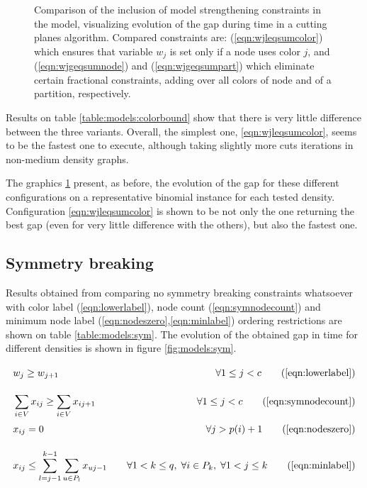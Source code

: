 \begin{figure}
\caption{Comparison of the inclusion of model strengthening constraints in the model, visualizing evolution of the gap during time in a cutting planes algorithm. Compared constraints are: (\ref{eqn:wjleqsumcolor}) which ensures that variable $w_j$ is set only if a node uses color $j$, and (\ref{eqn:wjgeqsumnode}) and (\ref{eqn:wjgeqsumpart}) which eliminate certain fractional constraints, adding over all colors of node and of a partition, respectively.}
\label{fig:models:colorbound}
\end{figure}

Results on table \ref{table:models:colorbound} show that there is very little difference between the three variants. Overall, the simplest one, \ref{eqn:wjleqsumcolor}, seems to be the fastest one to execute, although taking slightly more cuts iterations in non-medium density graphs. 

The graphics \ref{fig:models:colorbound} present, as before, the evolution of the gap for these different configurations on a representative binomial instance for each tested density. Configuration \ref{eqn:wjleqsumcolor} is shown to be not only the one returning the best gap (even for very little difference with the others), but also the fastest one.

\subsection{Symmetry breaking}

Results obtained from comparing no symmetry breaking constraints whatsoever with color label (\ref{eqn:lowerlabel}), node count (\ref{eqn:symnodecount}) and minimum node label (\ref{eqn:nodeszero},\ref{eqn:minlabel}) ordering restrictions are shown on table \ref{table:models:sym}. The evolution of the obtained gap in time for different densities is shown in figure \ref{fig:models:sym}.

\begin{align*}
& w_j \geq w_{j+1} \sumheight \quad &\forall 1 \leq j < c \tag{\ref{eqn:lowerlabel}} \\
& \sum_{i \in V} x_{ij} \geq \sum_{i \in V} x_{ij+1} \quad &\forall 1 \leq j < c \tag{\ref{eqn:symnodecount}} \\
& x_{ij} = 0 \sumheight \quad &\forall j > p(i) + 1 \tag{\ref{eqn:nodeszero}} \\
& x_{ij} \leq \sum_{l = j-1}^{k-1} \sum_{u \in P_l} x_{uj-1} \quad &\forall 1 < k \leq q, \; \forall i \in P_k, \; \forall 1 < j \leq k \tag{\ref{eqn:minlabel}}
\end{align*}

